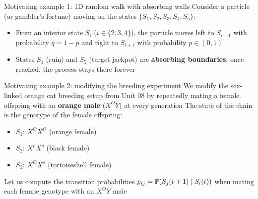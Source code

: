 \documentclass[aspectratio=169]{beamer}\usepackage[]{graphicx}\usepackage[]{xcolor}
\begin{document}
\begin{frame}{Motivating example 1: 1D random walk with absorbing walls}
Consider a particle (or gambler's fortune) moving on the states $\{S_1, S_2, S_3, S_4, S_5\}$:
\begin{itemize}
\item From an interior state $S_i$ ($i \in \{2,3,4\}$), the particle moves left to $S_{i-1}$ with probability $q = 1-p$ and right to $S_{i+1}$ with probability $p \in (0,1)$
\item States $S_1$ (ruin) and $S_5$ (target jackpot) are \textbf{absorbing boundaries}: once reached, the process stays there forever
\end{itemize}
\vfill
\begin{center}
\end{center}
\end{frame}

\begin{frame}{Motivating example 2: modifying the breeding experiment}
We modify the sex-linked orange cat breeding setup from Unit 08 by repeatedly mating a female offspring with an \textbf{orange male} ($X^O Y$) at every generation
\vfill
The state of the chain is the genotype of the female offspring:
\begin{itemize}
\item $S_1$: $X^O X^O$ (orange female)
\item $S_2$: $X^o X^o$ (black female)
\item $S_3$: $X^O X^o$ (tortoiseshell female)
\end{itemize}
\vfill
Let us compute the transition probabilities $p_{ij} = \mathbb{P}(S_j(t+1) \mid S_i(t))$ when mating each female genotype with an $X^O Y$ male
\end{frame}
\end{document}
